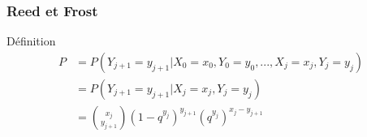\begin{frame}
    \frametitle{Reed et Frost}

    \begin{alertblock}{Définition}
        \begin{align}
            P &= P(Y_{j+1} = y_{j+1} | X_0 = x_0, Y_0 = y_0, ..., X_j = x_j, Y_j = y_j) \\
              &= P(Y_{j+1} = y_{j+1} | X_j = x_j, Y_j = y_j) \\
              &= \binom{x_j}{y_{j+1}}(1 - q^{y_j})^{y_{j+1}}(q^{y_j})^{x_j - y_{j+1}}
        \end{align}
    \end{alertblock}
\end{frame}
